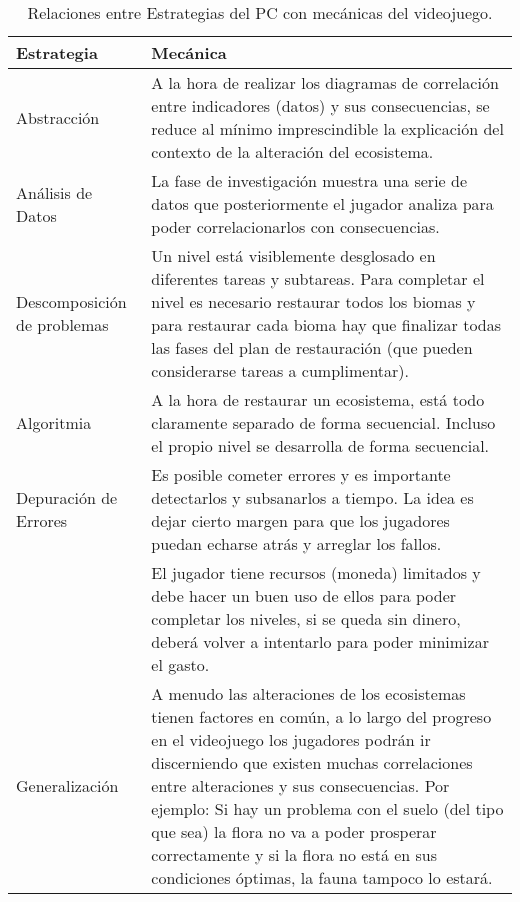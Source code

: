 \begin{table}[ht!]
\begin{center}
\setlength{\tabcolsep}{5pt}
\renewcommand{\arraystretch}{1.2}
\begin{tabular}{ | m{8em} | m{30em} | } 
  \hline
  Estrategia & Mecánica \\ 
  \hline
  Abstracción & A la hora de realizar los diagramas de correlación entre indicadores (datos) y sus consecuencias, se reduce al mínimo imprescindible la explicación del contexto de la alteración del ecosistema. \\ 
  \hline
  Análisis de Datos & La fase de investigación muestra una serie de datos que posteriormente el jugador analiza para poder correlacionarlos con consecuencias. \\ 
  \hline
  Descomposición de problemas & Un nivel está visiblemente desglosado en diferentes tareas y subtareas. Para completar el nivel es necesario restaurar todos los biomas y para restaurar cada bioma hay que finalizar todas las fases del plan de restauración (que pueden considerarse tareas a cumplimentar). \\ 
  \hline
  Algoritmia & A la hora de restaurar un ecosistema, está todo claramente separado de forma secuencial. Incluso el propio nivel se desarrolla de forma secuencial. \\ 
  \hline
  Depuración de Errores & Es posible cometer errores y es importante detectarlos y subsanarlos a tiempo. La idea es dejar cierto margen para que los jugadores puedan echarse atrás y arreglar los fallos. \\ 
  \hline
    & El jugador tiene recursos (moneda) limitados y debe hacer un buen uso de ellos para poder completar los niveles, si se queda sin dinero, deberá volver a intentarlo para poder minimizar el gasto. \\ 
  \hline
  Generalización & A menudo las alteraciones de los ecosistemas tienen factores en común, a lo largo del progreso en el videojuego los jugadores podrán ir discerniendo que existen muchas correlaciones entre alteraciones y sus consecuencias. Por ejemplo: Si hay un problema con el suelo (del tipo que sea) la flora no va a poder prosperar correctamente y si la flora no está en sus condiciones óptimas, la fauna tampoco lo estará. \\ 
  \hline
\end{tabular}
\centering
\caption{Relaciones entre Estrategias del PC con mecánicas del videojuego.}
\label{fig:tablaPCMecanicas}
\end{center}
\end{table}

